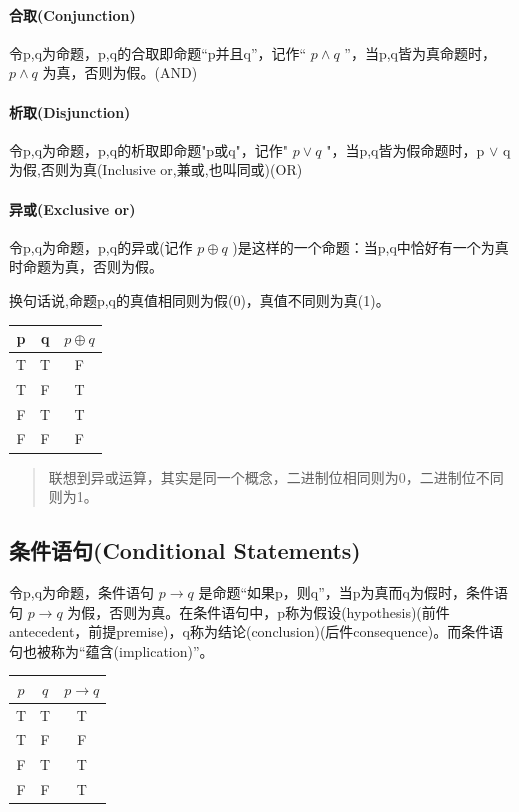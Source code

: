 \documentclass[12pt,a4paper,oneside]{ctexart}
\begin{document}
\paragraph*{合取(Conjunction)}

令p,q为命题，p,q的合取即命题``p并且q''，记作`` \(p\wedge q\) ''，当p,q皆为真命题时， \(p\wedge q\) 为真，否则为假。(AND)

\paragraph*{析取(Disjunction)}

令p,q为命题，p,q的析取即命题"p或q"，记作" \(p\vee q\) "，当p,q皆为假命题时，p \(\vee\) q为假,否则为真(Inclusive or,兼或,也叫同或)(OR)

\paragraph*{异或(Exclusive or)}

令p,q为命题，p,q的异或(记作 \(p\oplus q\) )是这样的一个命题：当p,q中恰好有一个为真时命题为真，否则为假。

换句话说,命题p,q的真值相同则为假(0)，真值不同则为真(1)。

\begin{tabular}{@{}ccc@{}}
\hline
p & q & \(p\oplus q\) \\
\hline
T & T & F \\
T & F & T \\
F & T & T \\
F & F & F \\
\hline
\end{tabular}

\begin{quote}
联想到异或运算，其实是同一个概念，二进制位相同则为0，二进制位不同则为1。
\end{quote}

\subsection*{条件语句(Conditional Statements)}

令p,q为命题，条件语句 \(p\rightarrow q\) 是命题``如果p，则q''，当p为真而q为假时，条件语句 \(p\rightarrow q\) 为假，否则为真。在条件语句中，p称为假设(hypothesis)(前件antecedent，前提premise)，q称为结论(conclusion)(后件consequence)。而条件语句也被称为``蕴含(implication)''。

\begin{tabular}{@{}ccc@{}}
\hline
\(p\) & \(q\) & \(p\rightarrow q\) \\
\hline
T & T & T \\
T & F & F \\
F & T & T \\
F & F & T \\
\hline
\end{tabular}
\end{document}
